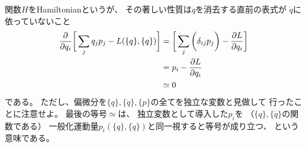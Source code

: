 関数$H$をHamiltonianというが、
その著しい性質は$\dot{q}$を消去する直前の表式が
$\dot{q}$に依っていないこと
\begin{align}
  \dfrac{\partial}{\partial \dot{q}_i}
  \bigg[
    \sum_j
      \dot{q}_j p_j
  - L(\{q\}, \{\dot{q}\})
  \bigg]
  &=
  \bigg[
    \sum_j\bigg(
      \delta_{ij} p_j
    \bigg)
  - \dfrac{\partial L}{\partial \dot{q}_i}
  \bigg]
\notag\\&=
    p_i
    - \dfrac{\partial L}{\partial \dot{q}_i}
\notag\\
  &\simeq 0
\end{align}
である。
ただし、偏微分を$\{q\},\{\dot{q}\},\{p\}$の全てを独立な変数と見做して
行ったことに注意せよ。
最後の等号$\simeq$は、
独立変数として導入した$p_i$を
（$\{q\},\{\dot{q}\}$の関数である）
一般化運動量$p_i(\{q\},\{\dot{q}\})$と同一視すると等号が成り立つ、
という意味である。

